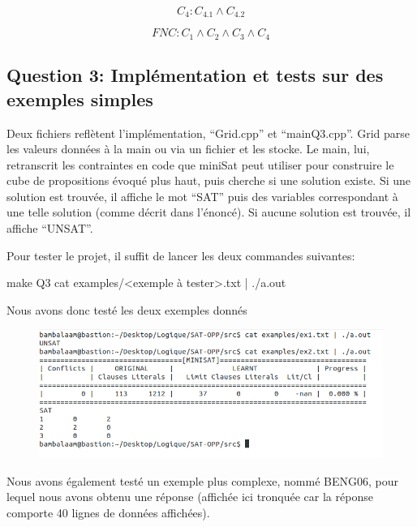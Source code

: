 \documentclass[a4paper,10pt]{article}
\begin{document}
\begin{center}
$$C_4: C_{4.1} \wedge C_{4.2}$$
\end{center}


\begin{center}
$$FNC: C_1 \wedge C_2 \wedge C_3 \wedge C_4$$
\end{center}

\newpage

\subsection{Question 3: Implémentation et tests sur des exemples simples}

Deux fichiers reflètent l'implémentation, ``Grid.cpp'' et ``mainQ3.cpp''. Grid parse les valeurs données à la main ou via un fichier et les stocke. Le main, lui, retranscrit les contraintes en code que miniSat peut utiliser pour construire le cube de propositions évoqué plus haut, puis cherche si une solution existe. Si une solution est trouvée, il affiche le mot ``SAT'' puis des variables correspondant à une telle solution (comme décrit dans l'énoncé). Si aucune solution est trouvée, il affiche ``UNSAT''.

Pour tester le projet, il suffit de lancer les deux commandes suivantes:

make Q3
cat examples/<exemple à tester>.txt | ./a.out

Nous avons donc testé les deux exemples donnés 
\begin{figure}[htb!]
\centering
\includegraphics[scale=0.55]{SAT-Simple}
\end{figure}

Nous avons également testé un exemple plus complexe, nommé BENG06, pour lequel nous avons obtenu une réponse (affichée ici tronquée car la réponse comporte 40 lignes de données affichées).
\end{document}
